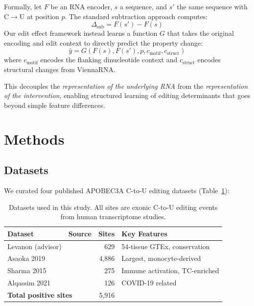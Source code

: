 \documentclass[11pt]{article}
\begin{document}
Formally, let $F$ be an RNA encoder, $s$ a sequence, and $s'$ the same sequence
with C$\to$U at position $p$. The standard subtraction approach computes:
\begin{equation}
  \Delta_{\text{sub}} = F(s') - F(s)
  \label{eq:subtraction}
\end{equation}
Our edit effect framework instead learns a function $G$ that takes the original
encoding and edit context to directly predict the property change:
\begin{equation}
  \hat{y} = G(F(s), F(s'), p, c_{\text{motif}}, c_{\text{struct}})
  \label{eq:edit_effect}
\end{equation}
where $c_{\text{motif}}$ encodes the flanking dinucleotide context and
$c_{\text{struct}}$ encodes structural changes from ViennaRNA.

This decouples the \emph{representation of the underlying RNA} from the
\emph{representation of the intervention}, enabling structured learning of
editing determinants that goes beyond simple feature differences.

\section{Methods}

\subsection{Datasets}

We curated four published APOBEC3A C-to-U editing datasets (Table~\ref{tab:datasets}):

\begin{table}[htb]
\centering
\caption{Datasets used in this study. All sites are exonic C-to-U editing events
from human transcriptome studies.}
\label{tab:datasets}
\begin{tabular}{@{}llrl@{}}
\toprule
\textbf{Dataset} & \textbf{Source} & \textbf{Sites} & \textbf{Key Features} \\
\midrule
Levanon (advisor) & \citet{levanon2024} & 629 & 54-tissue GTEx, conservation \\
Asaoka 2019 & \citet{asaoka2019} & 4,886 & Largest, monocyte-derived \\
Sharma 2015 & \citet{sharma2015} & 275 & Immune activation, TC-enriched \\
Alqassim 2021 & \citet{alqassim2021} & 126 & COVID-19 related \\
\midrule
\multicolumn{2}{l}{\textbf{Total positive sites}} & 5,916 & \\
\bottomrule
\end{tabular}
\end{table}
\end{document}
